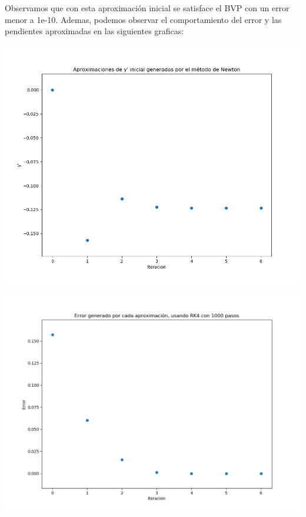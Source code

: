 \documentclass[11pt]{article}
\makeatletter
\def\maxwidth{\ifdim\Gin@nat@width>\linewidth\linewidth
    \else\Gin@nat@width\fi}
\let\Oldincludegraphics\includegraphics
\renewcommand{\includegraphics}[1]{\Oldincludegraphics[width=.8\maxwidth]{#1}}
\makeatother
\begin{document}
Observamos que con esta aproximación inicial se satisface el BVP con un error menor a 1e-10. Ademas, podemos observar el comportamiento del error y las pendientes aproximadas en las siguientes graficas:

    \begin{center}
    \includegraphics{fig 6.1.png}
    \end{center}
    
   \begin{center}
    \includegraphics{fig 6.2.png}
    \end{center}

    
    
    
    
\end{document}
